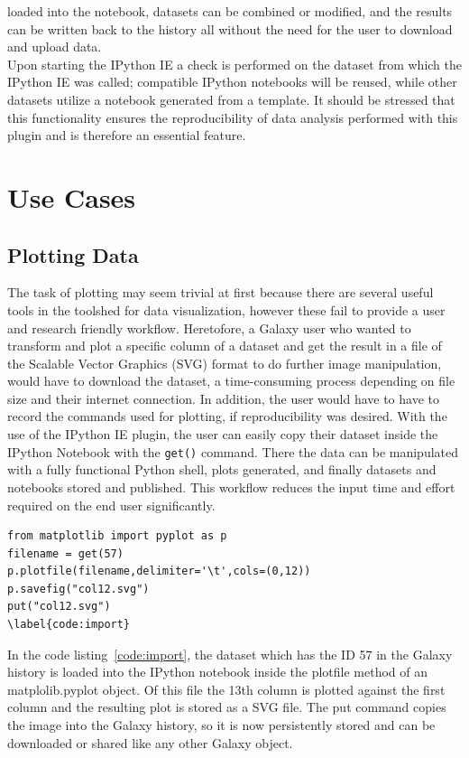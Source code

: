 \documentclass{bioinfo}
\begin{document}
\begin{methods}
loaded into the notebook, datasets can be combined or modified, and the results can be written back to the history
all without the need for the user to download and upload data. \\
Upon starting the IPython IE a check is performed on the dataset from which the IPython IE was called; compatible IPython
notebooks will be reused, while other datasets utilize a notebook generated from a template. It should be stressed that
this functionality ensures the reproducibility of data analysis performed with this plugin and is therefore an essential
feature.


\section{Use Cases}
\subsection{Plotting Data}
The task of plotting may seem trivial at first because there are several useful tools in the toolshed for data visualization,
however these fail to provide a user and research friendly workflow.
Heretofore, a Galaxy user who wanted to transform and plot a specific column of a dataset and
get the result in a file of the Scalable Vector Graphics (SVG) format to do further image manipulation,
would have to download the dataset, a time-consuming process depending on file size and their internet
connection. In addition, the user would have to have to record the commands used for plotting, if reproducibility was desired.
With the use of the IPython IE plugin, the user
can easily copy their dataset inside the IPython Notebook with the \texttt{get()} command. There the data can be manipulated 
with a fully functional Python shell, plots generated, and finally datasets and notebooks stored and published.
This workflow reduces the input time and effort required on the end user significantly.

\begin{lstlisting}[frame=single]
from matplotlib import pyplot as p
filename = get(57)
p.plotfile(filename,delimiter='\t',cols=(0,12))
p.savefig("col12.svg")
put("col12.svg")
\label{code:import}
\end{lstlisting}
In the code listing~\ref{code:import}, the dataset which has the ID 57 in the Galaxy history is loaded into the IPython notebook inside the
plotfile method of an matplolib.pyplot object. Of this file the 13th column is plotted against the first column and the
resulting plot is stored as a SVG file. The put command copies the image into the Galaxy history, so it is now persistently
stored and can be downloaded or shared like any other Galaxy object.


\end{methods}
\end{document}
